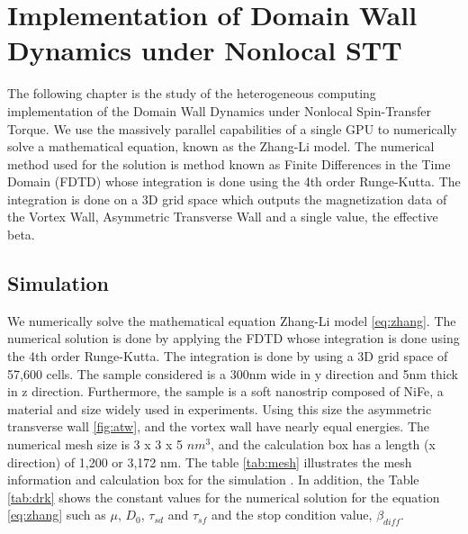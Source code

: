 
\chapter{Implementation of Domain Wall Dynamics under Nonlocal STT} %

\label{Implementation of Domain Wall Dynamics under Nonlocal STT} %


The following chapter is the study of the heterogeneous computing implementation of the Domain Wall Dynamics under Nonlocal Spin-Transfer Torque. We use the massively parallel capabilities of a single GPU to numerically solve a mathematical equation, known as the Zhang-Li model. The numerical method used for the solution is method known as Finite Differences in the Time Domain (FDTD) whose integration is done using the 4th order Runge-Kutta. The integration is done on a 3D grid space which outputs the magnetization data of the Vortex Wall, Asymmetric Transverse Wall and a single value, the effective beta.

\section{Simulation}

We numerically solve the mathematical equation Zhang-Li model \ref{eq:zhang}. The numerical solution is done by applying the FDTD whose integration is done using the 4th order Runge-Kutta. The integration is done by using a 3D grid space of 57,600 cells. The sample considered is a 300nm wide in y direction and 5nm thick in z direction. Furthermore, the sample is a soft nanostrip composed of NiFe, a material and size widely used in experiments. Using this size the asymmetric transverse wall \ref{fig:atw}, and the vortex wall have nearly equal energies. The numerical mesh size is 3 x 3 x 5 $nm^3$, and the calculation box has a length (x direction) of 1,200 or 3,172 nm. The table \ref{tab:mesh} illustrates the mesh information and calculation box for the simulation \cite{claudio}. In addition, the Table \ref{tab:drk} shows the constant values for the numerical solution for the equation \ref{eq:zhang} such as $\mu$, $D_{0}$, $\tau_{sd}$ and $\tau_{sf}$ and the stop condition value, $\beta_{diff}$.

